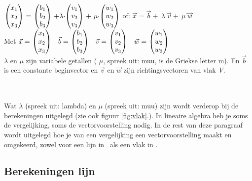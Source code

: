 {  $ \vecdriesnel{x} \ =\ \vecdriesnel{b}  \ +  \lambda\cdot \vecdriesnel{v} \   + \  \mu\cdot \vecdriesnel{w} $ \qquad \qquad  of:  $ \vec{x}  =   \vec{b}  + \  \lambda \ \vec{v} + \  \mu \ \vec{w}  $ }\\ 
Met $ \vec{x}  = \   \vecdriesnel{x}  \quad    \vec{b} = \  \vecdriesnel{b} \quad    \vec{v} =  \  \vecdriesnel{v} \quad   \vec{w} =  \ \vecdriesnel{w} $  \\   $ \lambda $ en  $ \mu $ zijn variabele getallen ( $ \mu $, spreek uit: muu, is de Griekse letter m). En  $ \vec{b} $ is een constante beginvector en $ \vec{v}  $  en $ \vec{w}  $ zijn richtingsvectoren van vlak \textit{V}.\\ \\ \\ 


Wat  $ \lambda $ (spreek uit: lambda) en  $ \mu $ (spreek uit: muu) zijn wordt verderop bij de berekeningen uitgelegd (zie ook figuur  \ref{fig:vlak}.).  In lineaire algebra heb je soms de vergelijking, soms de vectorvoorstelling nodig. In de rest van deze paragraaf wordt uitgelegd hoe je van een vergelijking een vectorvoorstelling maakt en omgekeerd, zowel voor een lijn in \RT \ als een vlak in \RD. 


\subsection{Berekeningen lijn}

